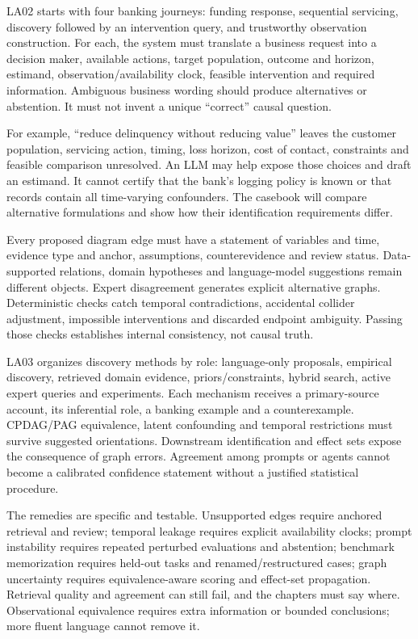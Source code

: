 \documentclass[
  11pt,
  a4paper,
]{article}
\begin{document}
LA02 starts with four banking journeys: funding response, sequential
servicing, discovery followed by an intervention query, and trustworthy
observation construction. For each, the system must translate a business
request into a decision maker, available actions, target population,
outcome and horizon, estimand, observation/availability clock, feasible
intervention and required information. Ambiguous business wording should
produce alternatives or abstention. It must not invent a unique
``correct'' causal question.

For example, ``reduce delinquency without reducing value'' leaves the
customer population, servicing action, timing, loss horizon, cost of
contact, constraints and feasible comparison unresolved. An LLM may help
expose those choices and draft an estimand. It cannot certify that the
bank's logging policy is known or that records contain all time-varying
confounders. The casebook will compare alternative formulations and show
how their identification requirements differ.

Every proposed diagram edge must have a statement of variables and time,
evidence type and anchor, assumptions, counterevidence and review
status. Data-supported relations, domain hypotheses and language-model
suggestions remain different objects. Expert disagreement generates
explicit alternative graphs. Deterministic checks catch temporal
contradictions, accidental collider adjustment, impossible interventions
and discarded endpoint ambiguity. Passing those checks establishes
internal consistency, not causal truth.

LA03 organizes discovery methods by role: language-only proposals,
empirical discovery, retrieved domain evidence, priors/constraints,
hybrid search, active expert queries and experiments. Each mechanism
receives a primary-source account, its inferential role, a banking
example and a counterexample. CPDAG/PAG equivalence, latent confounding
and temporal restrictions must survive suggested orientations.
Downstream identification and effect sets expose the consequence of
graph errors. Agreement among prompts or agents cannot become a
calibrated confidence statement without a justified statistical
procedure.

The remedies are specific and testable. Unsupported edges require
anchored retrieval and review; temporal leakage requires explicit
availability clocks; prompt instability requires repeated perturbed
evaluations and abstention; benchmark memorization requires held-out
tasks and renamed/restructured cases; graph uncertainty requires
equivalence-aware scoring and effect-set propagation. Retrieval quality
and agreement can still fail, and the chapters must say where.
Observational equivalence requires extra information or bounded
conclusions; more fluent language cannot remove it.
\end{document}
